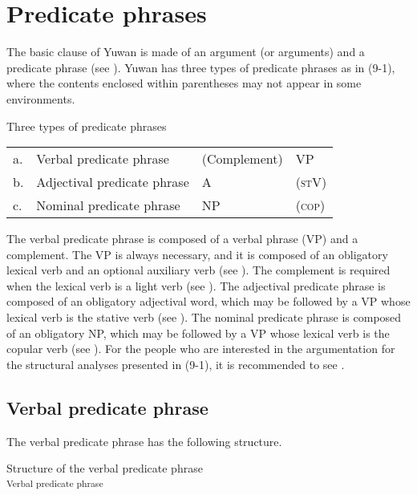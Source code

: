 \chapter{Predicate phrases}\label{chap:9}

The basic clause of Yuwan is made of an argument (or arguments) and a predicate phrase (see ). Yuwan has three types of predicate phrases as in (9-1), where the contents enclosed within parentheses may not appear in some environments.

\ea   Three types of predicate phrases \label{ex:9.1}
  \begin{tabular}{@{}l@{ }lll@{}}
  a. & Verbal predicate phrase      &  (Complement)         &  VP\footnotemark[1]\\
  b. & Adjectival predicate phrase  &  A\footnotemark[2]    & (\textsc{st}V\footnotemark[3])\\
  c. & Nominal predicate phrase     &  NP                   & (\textsc{cop}\footnotemark[4])\\
  \end{tabular}
\z
{}

The verbal predicate phrase is composed of a verbal phrase (VP) and a complement. The VP is always necessary, and it is composed of an obligatory lexical verb and an optional auxiliary verb (see ). The complement is required when the lexical verb is a light verb (see ). The adjectival predicate phrase is composed of an obligatory adjectival word, which may be followed by a VP whose lexical verb is the stative verb (see ). The nominal predicate phrase is composed of an obligatory NP, which may be followed by a VP whose lexical verb is the copular verb (see ). For the people who are interested in the argumentation for the structural analyses presented in (9-1), it is recommended to see .

\section{Verbal predicate phrase}\label{sec:9.1}

The verbal predicate phrase has the following structure.

\ea   Structure of the verbal predicate phrase \label{ex:9.2}\\\textsubscript{Verbal predicate phrase}
\z

